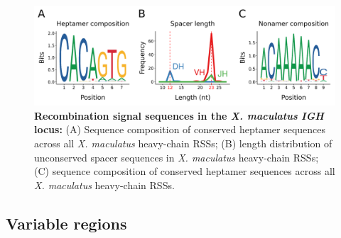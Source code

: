 		\begin{figure}
	\includegraphics[width=\textwidth]{_Figures/png/xma-rss-seqlogo-all}
	\caption[Recombination signal sequences in the \textit{X. maculatus} \textit{IGH} locus]{\textbf{Recombination signal sequences in the \textit{X. maculatus} \textit{IGH} locus:} (A) Sequence composition of conserved heptamer sequences across all \textit{X. maculatus} heavy-chain RSSs; (B) length distribution of unconserved spacer sequences in \textit{X. maculatus} heavy-chain RSSs; (C) sequence composition of conserved heptamer sequences across all \textit{X. maculatus} heavy-chain RSSs.}
	\label{fig:xma-rss-seqlogo-all}
	\end{figure} %

	


	\subsection{Variable regions}
	
